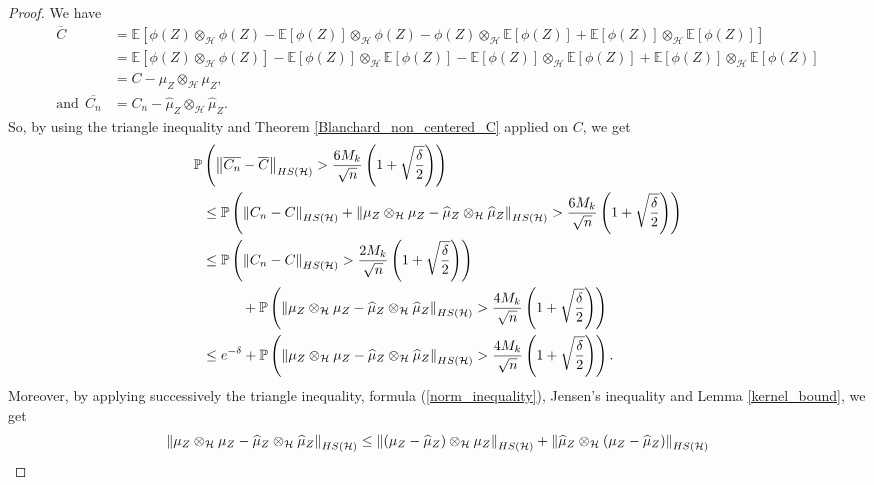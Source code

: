 \documentclass[twoside,11pt]{article}
\newcommand{\Hk}{\mathcal{H}}
\newcommand{\HSk}{HS(\mathcal{H})}
\newcommand{\PPO}{\mathbb{P} }
\newcommand{\EE}{\mathbb{E}}%
\begin{document}
\begin{proof}
    We have 
    \begin{align*}
        \overline{C} &= \EE\left[\phi(Z) \otimes_{\Hk} \phi(Z) -  \EE[\phi(Z)] \otimes_{\Hk} \phi(Z) -  \phi(Z) \otimes_{\Hk} \EE[\phi(Z)] + \EE[\phi(Z)] \otimes_{\Hk} \EE[\phi(Z)] \right] \\
        &= \EE[\phi(Z) \otimes_{\Hk} \phi(Z)] - \EE[\phi(Z)] \otimes_{\Hk}  \EE[\phi(Z)] - \EE[\phi(Z)] \otimes_{\Hk}  \EE[\phi(Z)] + \EE[\phi(Z)] \otimes_{\Hk} \EE[\phi(Z)] \\
        &= C - \mu_Z \otimes_{\Hk} \mu_Z, \\
        \text{and} \ \ \overline{C_n} &= C_n - \widehat{\mu}_Z  \otimes_{\Hk} \widehat{\mu}_Z.
    \end{align*}
So, by using the triangle inequality and Theorem \ref{Blanchard_non_centered_C} applied on $C$, we get 
\begin{align}
    \PPO &\left( \left \| \overline{C_n} - \overline{C} \right \|_{\HSk} > \frac{6 M_k}{\sqrt{n}} \left(1+ \sqrt{\frac{\delta}{2}}\right) \right) \notag \\
    & \leq \PPO \left( \left \| C_n - C \right \|_{\HSk} +  \left \| \mu_Z \otimes_{\Hk} \mu_Z - \widehat{\mu}_Z  \otimes_{\Hk} \widehat{\mu}_Z \right \|_{\HSk} > \frac{6 M_k}{\sqrt{n}} \left(1+ \sqrt{\frac{\delta}{2}}\right) \right)  \notag \\
    &  \leq  \PPO \left( \left \| C_n - C \right \|_{\HSk} > \frac{2 M_k}{\sqrt{n}} \left(1+ \sqrt{\frac{\delta}{2}}\right) \right) \notag  \\
    & \hspace{1 cm} + \PPO \left( \left \| \mu_Z \otimes_{\Hk} \mu_Z - \widehat{\mu}_Z  \otimes_{\Hk} \widehat{\mu}_Z \right \|_{\HSk} > \frac{4 M_k}{\sqrt{n}} \left(1+ \sqrt{\frac{\delta}{2}}\right) \right)  \notag \\
    &  \leq  e^{-\delta} + \PPO \left( \left \| \mu_Z \otimes_{\Hk} \mu_Z - \widehat{\mu}_Z  \otimes_{\Hk} \widehat{\mu}_Z \right \|_{\HSk} > \frac{4 M_k}{\sqrt{n}} \left(1+ \sqrt{\frac{\delta}{2}}\right) \right).
    \label{first_comput}
\end{align}
Moreover, by applying successively the triangle inequality, formula (\ref{norm_inequality}), Jensen's inequality and Lemma \ref{kernel_bound}, we get 
\begin{align}
    \left \| \mu_Z \otimes_{\Hk} \mu_Z - \widehat{\mu}_Z  \otimes_{\Hk} \widehat{\mu}_Z \right \|_{\HSk} & \leq   \left \| \left(\mu_Z -  \widehat{\mu}_Z  \right) \otimes_{\Hk} \mu_Z \right \|_{\HSk} + \left \| \widehat{\mu}_Z \otimes_{\Hk} \left(\mu_Z -  \widehat{\mu}_Z  \right) \right \|_{\HSk} \notag \\

\end{align}
\end{proof}
\end{document}
